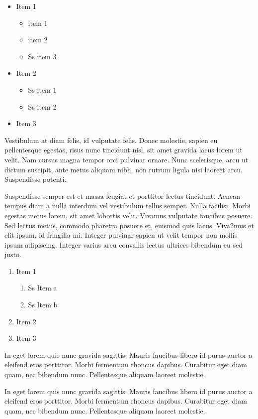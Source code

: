 ﻿\documentclass[year=2013]{jres}
\begin{document}
\begin{itemize}
  \item Item 1
  \begin{itemize}
    \item item 1
    \item item 2
    \item Ss item 3
  \end{itemize}
  \item Item 2
  \begin{itemize}
    \item Ss item 1
    \item Ss item 2
  \end{itemize}
  \item Item 3
\end{itemize}

Vestibulum at diam felis, id vulputate felis. Donec molestie, sapien eu pellentesque egestas, risus nunc tincidunt nisl, sit amet gravida lacus lorem ut velit. Nam cursus magna tempor orci pulvinar ornare. Nunc scelerisque, arcu ut dictum suscipit, ante metus aliquam nibh, non rutrum ligula nisi laoreet arcu. Suspendisse potenti. 

Suspendisse semper est et massa feugiat et porttitor lectus tincidunt. Aenean tempus diam a nulla interdum vel vestibulum tellus semper. Nulla facilisi. Morbi egestas metus lorem, sit amet lobortis velit. Vivamus vulputate faucibus posuere. Sed lectus metus, commodo pharetra posuere et, euismod quis lacus. Viva2mus et elit ipsum, id fringilla mi. Integer pulvinar sapien ut velit tempor non mollis ipsum adipiscing. Integer varius arcu convallis lectus ultrices bibendum eu sed justo. 

\begin{enumerate}
  \item Item 1
  \begin{enumerate}
    \item Ss Item a
    \item Ss Item b
  \end{enumerate}
  \item Item 2
  \item Item 3
\end{enumerate}

In eget lorem quis nunc gravida sagittis. Mauris faucibus libero id purus auctor a eleifend eros porttitor. Morbi fermentum rhoncus dapibus. Curabitur eget diam quam, nec bibendum nunc. Pellentesque aliquam laoreet molestie. 

In eget lorem quis nunc gravida sagittis. Mauris faucibus libero id purus auctor a eleifend eros porttitor. Morbi fermentum rhoncus dapibus. Curabitur eget diam quam, nec bibendum nunc. Pellentesque aliquam laoreet molestie. 
\end{document}
